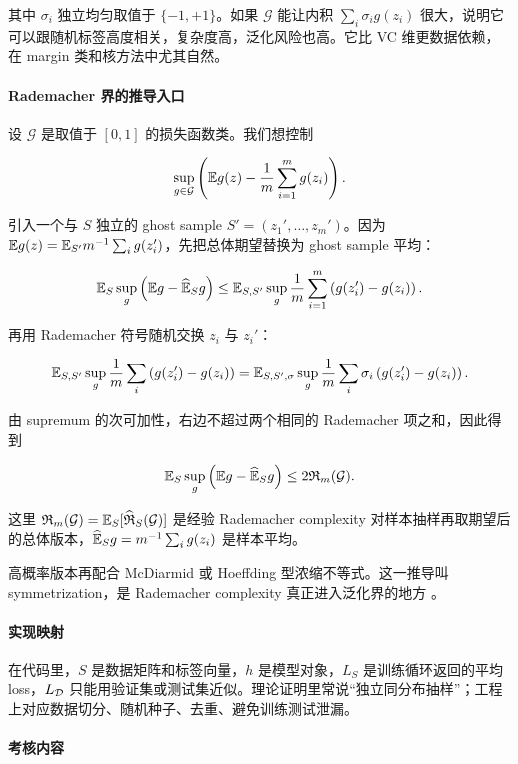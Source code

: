 其中 \(\sigma_i\) 独立均匀取值于 \(\{-1,+1\}\)。如果 \(\mathcal{G}\) 能让内积 \(\sum_i\sigma_i g(z_i)\) 很大，说明它可以跟随机标签高度相关，复杂度高，泛化风险也高。它比 VC 维更数据依赖，在 margin 类和核方法中尤其自然。

\paragraph{Rademacher 界的推导入口}

设 \(\mathcal{G}\) 是取值于 \([0,1]\) 的损失函数类。我们想控制

\[
  \sup_{g\in\mathcal{G}}
  \left(
    \mathbb{E} g(z)-\frac1m\sum_{i=1}^{m}g(z_i)
  \right).
\]

引入一个与 \(S\) 独立的 ghost sample \(S'=(z_1',\ldots,z_m')\)。因为 \(\mathbb{E} g(z)=\mathbb{E}_{S'}m^{-1}\sum_i g(z_i')\)，先把总体期望替换为 ghost sample 平均：

\[
  \mathbb{E}_S
  \sup_g
  \left(
    \mathbb{E} g-\widehat{\mathbb{E}}_S g
  \right)
  \le
  \mathbb{E}_{S,S'}
  \sup_g
  \frac1m
  \sum_{i=1}^{m}
  \left(g(z_i')-g(z_i)\right).
\]

再用 Rademacher 符号随机交换 \(z_i\) 与 \(z_i'\)：

\[
  \mathbb{E}_{S,S'}
  \sup_g
  \frac1m
  \sum_i
  \left(g(z_i')-g(z_i)\right)
  =
  \mathbb{E}_{S,S',\sigma}
  \sup_g
  \frac1m
  \sum_i
  \sigma_i
  \left(g(z_i')-g(z_i)\right).
\]

由 supremum 的次可加性，右边不超过两个相同的 Rademacher 项之和，因此得到

\[
  \mathbb{E}_S
  \sup_g
  \left(
    \mathbb{E} g-\widehat{\mathbb{E}}_S g
  \right)
  \le
  2\mathfrak{R}_m(\mathcal{G}).
\]

这里 \(\mathfrak{R}_m(\mathcal{G})=\mathbb{E}_S[\widehat{\mathfrak{R}}_S(\mathcal{G})]\) 是经验 Rademacher complexity 对样本抽样再取期望后的总体版本，\(\widehat{\mathbb{E}}_S g=m^{-1}\sum_i g(z_i)\) 是样本平均。

高概率版本再配合 McDiarmid 或 Hoeffding 型浓缩不等式。这一推导叫 symmetrization，是 Rademacher complexity 真正进入泛化界的地方 \parencite{mohri2018foundations}。

\paragraph{实现映射}

在代码里，\(S\) 是数据矩阵和标签向量，\(h\) 是模型对象，\(L_S\) 是训练循环返回的平均 loss，\(L_{\mathcal{D}}\) 只能用验证集或测试集近似。理论证明里常说“独立同分布抽样”；工程上对应数据切分、随机种子、去重、避免训练测试泄漏。

\paragraph{考核内容}

